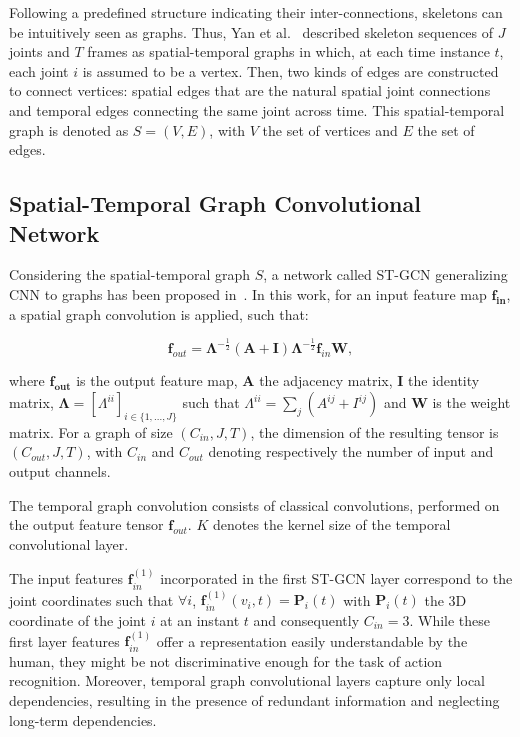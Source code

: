 \documentclass{article}
\begin{document}
Following a predefined structure indicating their inter-connections, skeletons can be intuitively seen as graphs. Thus, Yan et al.~\cite{yan2018spatial} described skeleton sequences of $J$ joints and $T$ frames as spatial-temporal graphs in which, at each time instance $t$, each joint $i$ is assumed to be a vertex. Then, two kinds of edges are constructed to connect vertices: spatial edges that are the natural spatial joint connections and temporal edges connecting the same joint across time.  This spatial-temporal graph is denoted as $S=(V,E)$, with $V$ the set of vertices and $E$ the set of edges.


\subsection{Spatial-Temporal Graph Convolutional Network}

Considering the spatial-temporal graph $S$, a network called ST-GCN generalizing CNN to graphs has been proposed in~\cite{yan2018spatial}. 
In this work, for an input feature map $\mathbf{f_{in}}$, a spatial graph convolution is applied, such that: 


\begin{equation}
    \mathbf{f}_{out} = \mathbf{\Lambda}^{-\frac{1}{2}}(\mathbf{A}+\mathbf{I})\mathbf{\Lambda}^{-\frac{1}{2}} \mathbf{f}_{in} \mathbf{W},
\end{equation}

\noindent where $\mathbf{f_{out}}$ is the output feature map, $\mathbf{A}$ the adjacency matrix, $\mathbf{I}$ the identity matrix, $\mathbf \Lambda=[\Lambda^{ii}]_{i \in \{1,...,J\}}$ such that $\Lambda^{ii}=\sum_j(A^{ij}+I^{ij})$ and $\mathbf{W}$ is the weight matrix. For a graph of size $(C_{in},J,T)$, the dimension of the resulting tensor is $(C_{out},J,T)$, with $C_{in}$ and $C_{out}$ denoting respectively the number of input and output channels.

The temporal graph convolution consists of classical convolutions, performed on the output feature tensor $\mathbf{f}_{out}$. $K$ denotes the kernel size of the temporal convolutional layer.

The input features $\mathbf f_{in}^{(1)}$ incorporated in the first ST-GCN layer correspond to the joint coordinates such that $\forall i$, $\mathbf f_{in}^{(1)}(v_i,t)=\mathbf{P}_i(t)$ with $\mathbf{P}_i(t)$ the 3D coordinate of the joint $i$ at an instant $t$ and consequently $C_{in}=3$. While these first layer features $\mathbf f_{in}^{(1)}$  offer a representation easily understandable by the human, they might be not discriminative enough for the task of action recognition. Moreover, temporal graph convolutional layers capture only local dependencies, resulting in the presence of redundant information and neglecting long-term dependencies. 
\end{document}
